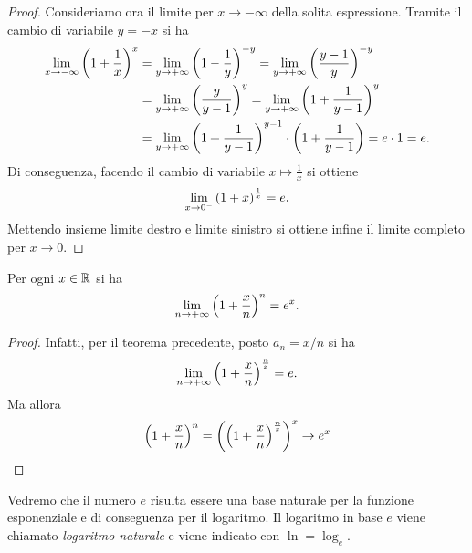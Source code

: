 \begin{proof}
  Consideriamo ora il limite per $x\to -\infty$ 
  della solita espressione. 
  Tramite il cambio di variabile $y=-x$ si ha 
  \begin{align*}
  \lim_{x\to -\infty} {\left( 1+\frac{1}{x} \right)}^x 
  &= \lim_{y\to +\infty} {\left( 1 - \frac 1 y \right)}^{-y}
   = \lim_{y\to +\infty} {\left( \frac {y-1} y \right)}^{-y}\\
  &= \lim_{y\to +\infty} {\left( \frac{y}{y-1} \right)}^y
   = \lim_{y\to +\infty} {\left( 1 + \frac{1}{y-1} \right)}^y\\
  &= \lim_{y\to +\infty} {\left( 1 + \frac{1}{y-1} \right)}^{y-1}
    \cdot{\left( 1+\frac 1 {y-1} \right)} 
    = e\cdot 1 = e.\\
  \end{align*}
  Di conseguenza, facendo il cambio di variabile $x\mapsto \frac 1 x$ 
  si ottiene
  \[
  \lim_{x\to 0^-} {\left( 1+x \right)}^{\frac 1 x} = e.
  \]
  Mettendo insieme limite destro e limite sinistro si ottiene 
  infine il limite completo per $x\to 0$. 
\end{proof}
%
\begin{corollary}%
\label{cor:limite_notevole_ex}%
\mymark{**}%
Per ogni $x\in {\mathbb R}$ si ha
\[
  \lim_{n\to +\infty} {\left( 1+ \frac x n \right)}^n = e^x.
\]
\end{corollary}
%
\begin{proof}
Infatti, per il teorema precedente, posto $a_n = x/n$ si ha
\[
\lim_{n\to +\infty}{\left( 1+\frac x n \right)}^{\frac n x} = e.
\]
Ma allora
\[
{\left( 1+ \frac x n \right)}^n = {\left( {\left( 1+\frac x n \right)}^{\frac n x} \right)}^x
\to e^x
\]
\end{proof}

\begin{definition}
Vedremo che il numero $e$ risulta essere una base naturale per la funzione
esponenziale e di conseguenza per il logaritmo. Il logaritmo in base
$e$ viene chiamato \emph{logaritmo naturale}%
%
 e viene indicato con $\ln = \log_e$.
\end{definition}


